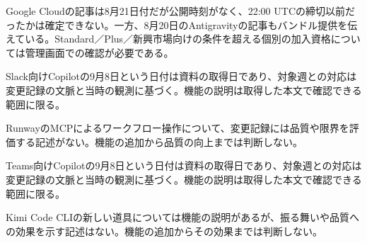 \begin{claimboundary}
Google Cloudの記事は8月21日付だが公開時刻がなく、22:00 UTCの締切以前だったかは確定できない。一方、8月20日のAntigravityの記事もバンドル提供を伝えている。Standard／Plus／新興市場向けの条件を超える個別の加入資格については管理画面での確認が必要である。\autocite{src-51b6521f4a58,src-8d408f26c5ec}
\end{claimboundary}
\begin{claimboundary}
Slack向けCopilotの9月8日という日付は資料の取得日であり、対象週との対応は変更記録の文脈と当時の観測に基づく。機能の説明は取得した本文で確認できる範囲に限る。\autocite{src-ab796c22c2d1}
\end{claimboundary}
\begin{claimboundary}
RunwayのMCPによるワークフロー操作について、変更記録には品質や限界を評価する記述がない。機能の追加から品質の向上までは判断しない。\autocite{src-c5fce7aa4ae4}
\end{claimboundary}
\begin{claimboundary}
Teams向けCopilotの9月8日という日付は資料の取得日であり、対象週との対応は変更記録の文脈と当時の観測に基づく。機能の説明は取得した本文で確認できる範囲に限る。\autocite{src-64ccd02222eb}
\end{claimboundary}
\begin{claimboundary}
Kimi Code CLIの新しい道具については機能の説明があるが、振る舞いや品質への効果を示す記述はない。機能の追加からその効果までは判断しない。\autocite{src-9191d43918fc}
\end{claimboundary}
